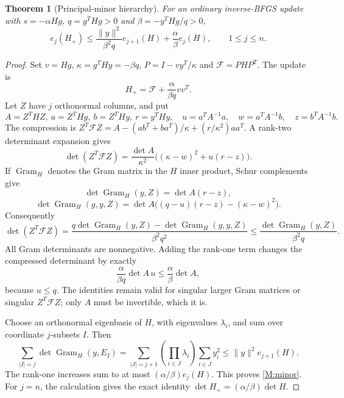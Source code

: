 \documentclass[10pt,oneside,openany]{book}
\newtheorem{theorem}{Theorem}[chapter]
\theoremstyle{remark}\newtheorem{remark}{Remark}[chapter]
\begin{document}
\begin{theorem}[Principal-minor hierarchy]\label{M:hierarchy}
For an ordinary inverse-BFGS update with $s=-\alpha Hg$, $q=g^THg>0$ and $\beta=-y^THg/q>0$,
\begin{equation}\label{M:minor}
 e_j(H_+)\le \frac{\|y\|^2}{\beta^2q}e_{j+1}(H)+\frac\alpha\beta e_j(H),\qquad1\le j\le n.
\end{equation}
\end{theorem}
\begin{proof}
Set $v=Hg$, $\kappa=g^THy=-\beta q$, $P=I-vy^T/\kappa$ and $\mathcal F=PHP^T$. The update is
\[
 H_+=\mathcal F+\frac{\alpha}{\beta q}vv^T.
\]
Let $Z$ have $j$ orthonormal columns, and put
\[
 A=Z^THZ,\ a=Z^THg,\ b=Z^THy,\ r=y^THy,
 \quad u=a^TA^{-1}a,\quad w=a^TA^{-1}b,\quad z=b^TA^{-1}b.
\]
The compression is $Z^T\mathcal FZ=A-(ab^T+ba^T)/\kappa+(r/\kappa^2)aa^T$. A rank-two determinant expansion gives
\[
 \det(Z^T\mathcal FZ)=\frac{\det A}{\kappa^2}\bigl((\kappa-w)^2+u(r-z)\bigr).
\]
If $\operatorname{Gram}_H$ denotes the Gram matrix in the $H$ inner product, Schur complements give
\[
 \det\operatorname{Gram}_H(y,Z)=\det A(r-z),
\]
\[
 \det\operatorname{Gram}_H(g,y,Z)
 =\det A\bigl((q-u)(r-z)-(\kappa-w)^2\bigr).
\]
Consequently
\begin{equation}\label{M:compression}
 \det(Z^T\mathcal FZ)
 =\frac{q\det\operatorname{Gram}_H(y,Z)-\det\operatorname{Gram}_H(g,y,Z)}{\beta^2q^2}
 \le\frac{\det\operatorname{Gram}_H(y,Z)}{\beta^2q}.
\end{equation}
All Gram determinants are nonnegative. Adding the rank-one term changes the compressed determinant by exactly
\[
 \frac{\alpha}{\beta q}\det A\,u\le\frac\alpha\beta\det A,
\]
because $u\le q$. The identities remain valid for singular larger Gram matrices or singular $Z^T\mathcal FZ$; only $A$ must be invertible, which it is.

Choose an orthonormal eigenbasis of $H$, with eigenvalues $\lambda_i$, and sum over coordinate $j$-subsets $I$. Then
\[
 \sum_{|I|=j}\det\operatorname{Gram}_H(y,E_I)
 =\sum_{|J|=j+1}\left(\prod_{i\in J}\lambda_i\right)\sum_{i\in J}y_i^2
 \le\|y\|^2e_{j+1}(H).
\]
The rank-one increases sum to at most $(\alpha/\beta)e_j(H)$. This proves \eqref{M:minor}. For $j=n$, the calculation gives the exact identity $\det H_+=(\alpha/\beta)\det H$.
\end{proof}
\end{document}
